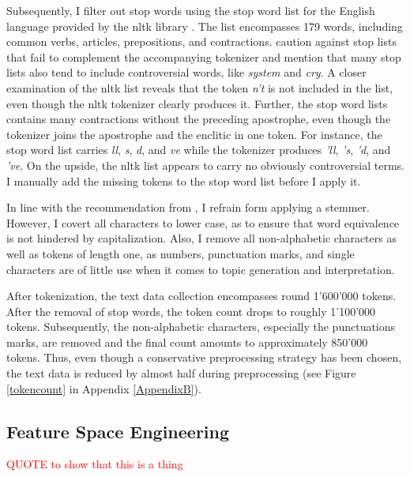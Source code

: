 \documentclass[11pt,a4paper,english,oneside]{book}
\numberwithin{equation}{chapter}
\begin{document}
Subsequently, I filter out stop words using the stop word list for the English language provided by the nltk library \citep{Bird.2010}. The list encompasses 179 words, including common verbs, articles, prepositions, and contractions. \citet[p. 8--9]{Nothman.2018} caution against stop lists that fail to complement the accompanying tokenizer and mention that many stop lists also tend to include controversial words, like \textit{system} and \textit{cry}. A closer examination of the nltk list reveals that the token \textit{n't} is not included in the list, even though the nltk tokenizer clearly produces it. Further, the stop word lists contains many contractions without the preceding apostrophe, even though the tokenizer joins the apostrophe and the enclitic in one token. For instance, the stop word list carries \textit{ll}, \textit{s}, \textit{d}, and \textit{ve} while the tokenizer produces \textit{'ll}, \textit{'s}, \textit{'d}, and \textit{'ve}. On the upside, the nltk list appears to carry no obviously controversial terms. I manually add the missing tokens to the stop word list before I apply it. 

In line with the recommendation from \cite{Schofield.2017}, I refrain form applying a stemmer. However, I covert all characters to lower case, as to ensure that word equivalence is not hindered by capitalization. Also, I remove all non-alphabetic characters as well as tokens of length one, as numbers, punctuation marks, and single characters are of little use when it comes to topic generation and interpretation. 

After tokenization, the text data collection encompasses round 1'600'000 tokens. After the removal of stop words, the token count drops to roughly 1'100'000 tokens. Subsequently, the non-alphabetic characters, especially the punctuations marks, are removed and the final count amounts to approximately 850'000 tokens. Thus, even though a conservative preprocessing strategy has been chosen, the text data is reduced by almost half during preprocessing (see Figure \ref{tokencount} in Appendix \ref{AppendixB}).

\subsection{Feature Space Engineering}\label{featueeng}
\textcolor{red}{QUOTE to show that this is a thing}
\end{document}
